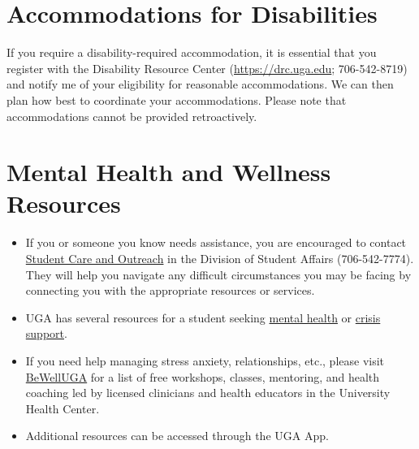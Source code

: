 \documentclass[12pt]{article}
\begin{document}
\vspace{-12pt}
\section*{\normalsize Accommodations for Disabilities}
\vspace{-4mm}

If you require a disability-required accommodation, it is essential
that you register with the Disability Resource Center (\url{https://drc.uga.edu}; 706-542-8719)
and notify me of your eligibility for reasonable accommodations. We
can then plan how best to coordinate your accommodations. Please note
that accommodations cannot be provided retroactively.



\vspace{-12pt}
\section*{\normalsize Mental Health and Wellness Resources}
\vspace{-4mm}

\begin{itemize}
  \setlength\itemsep{-6pt}
  \item If you or someone you know needs assistance, you are
    encouraged to contact \href{https://sco.uga.edu}{Student Care and
      Outreach} in the Division of Student Affairs (706-542-7774). They
    will help you navigate any difficult circumstances you may be facing
    by connecting you with the appropriate resources or services.
  \item UGA has several resources for a student seeking
    \href{https://www.uhs.uga.edu/bewelluga/bewelluga}{mental health}
    or \href{https://www.uhs.uga.edu/info/emergencies}{crisis support}.%
  \item If you need help managing stress anxiety, relationships, etc.,
    please visit \href{https://www.uhs.uga.edu/bewelluga/bewelluga}{BeWellUGA} %
    for a list of free workshops, classes, mentoring, and health
    coaching led by licensed clinicians and health educators in the
    University Health Center.
  \item Additional resources can be accessed through the UGA App.
\end{itemize}
\end{document}
